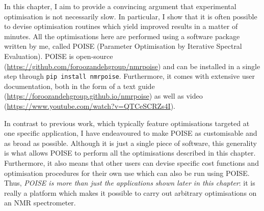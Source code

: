 In this chapter, I aim to provide a convincing argument that experimental optimisation is not necessarily slow.
In particular, I show that it is often possible to devise optimisation routines which yield improved results in a matter of minutes.
All the optimisations here are performed using a software package written by me, called POISE (Parameter Optimisation by Iterative Spectral Evaluation).
POISE is open-source (\url{https://github.com/foroozandehgroup/nmrpoise}) and can be installed in a single step through \texttt{pip install nmrpoise}.
Furthermore, it comes with extensive user documentation, both in the form of a text guide (\url{https://foroozandehgroup.github.io/nmrpoise}) as well as video (\url{https://www.youtube.com/watch?v=QTCeSCRZs4I}).

In contrast to previous work, which typically feature optimisations targeted at one specific application, I have endeavoured to make POISE as customisable and as broad as possible.
Although it is just a single piece of software, this generality is what allows POISE to perform all the optimisations described in this chapter.
Furthermore, it also means that other users can devise specific cost functions and optimisation procedures for their own use which can also be run using POISE.
Thus, \textit{POISE is more than just the applications shown later in this chapter}: it is really a platform which makes it possible to carry out arbitrary optimisations on an NMR spectrometer.
